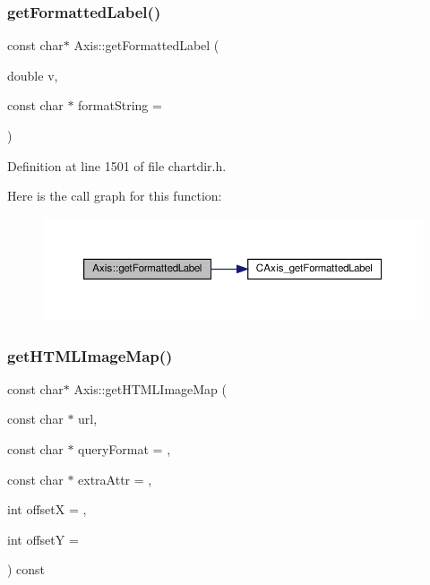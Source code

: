 \subsubsection{\texorpdfstring{get\+Formatted\+Label()}{getFormattedLabel()}}
{\footnotesize\ttfamily const char$\ast$ Axis\+::get\+Formatted\+Label (\begin{DoxyParamCaption}\item[{double}]{v,  }\item[{const char $\ast$}]{format\+String = {} }\end{DoxyParamCaption})\hspace{0.3cm}{\ttfamily [inline]}}



Definition at line 1501 of file chartdir.\+h.

Here is the call graph for this function\+:
\nopagebreak
\begin{figure}[H]
\begin{center}
\leavevmode
\includegraphics[width=350pt]{class_axis_a6a1b1952bcb2281243fe16470d814f9c_cgraph}
\end{center}
\end{figure}
\mbox{\label{class_axis_a278e6559be3e7201f1e6e986f4562042}} 
\subsubsection{\texorpdfstring{get\+H\+T\+M\+L\+Image\+Map()}{getHTMLImageMap()}}
{\footnotesize\ttfamily const char$\ast$ Axis\+::get\+H\+T\+M\+L\+Image\+Map (\begin{DoxyParamCaption}\item[{const char $\ast$}]{url,  }\item[{const char $\ast$}]{query\+Format = {},  }\item[{const char $\ast$}]{extra\+Attr = {},  }\item[{int}]{offsetX = {},  }\item[{int}]{offsetY = {} }\end{DoxyParamCaption}) const\hspace{0.3cm}{\ttfamily [inline]}}



